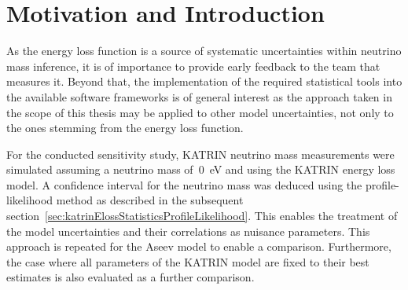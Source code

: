 \section{Motivation and Introduction}
\label{sec:katrinElossConcept}
As the energy loss function is a source of systematic uncertainties within neutrino mass inference, it is of importance to provide early feedback to the team that measures it. Beyond that, the implementation of the required statistical tools into the available software frameworks is of general interest as the approach taken in the scope of this thesis may be applied to other model uncertainties, not only to the ones stemming from the energy loss function.

For the conducted sensitivity study, KATRIN neutrino mass measurements were simulated assuming a neutrino mass of~\SI{0}{eV} and using the KATRIN energy loss model. A confidence interval for the neutrino mass was deduced using the profile-likelihood method as described in the subsequent section~\ref{sec:katrinElossStatisticsProfileLikelihood}. This enables the treatment of the model uncertainties and their correlations as nuisance parameters. This approach is repeated for the Aseev model to enable a comparison. Furthermore, the case where all parameters of the KATRIN model are fixed to their best estimates is also evaluated as a further comparison.

